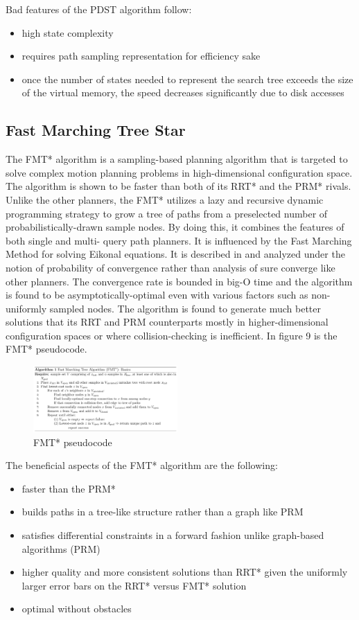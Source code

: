 \documentclass[conference]{IEEEtran} \usepackage[T1]{fontenc} \usepackage[backend=biber, style=ieee]{biblatex}
\begin{document}
Bad features of the PDST algorithm follow:
\begin{itemize}
 \item high state complexity
 \item requires path sampling representation for efficiency sake
 \item once the number of states needed to represent the search tree exceeds the size of the virtual memory, the speed decreases significantly due to disk accesses
\end{itemize}

\subsection{Fast Marching Tree Star} \label{FMT*}
The FMT* algorithm is a sampling-based planning algorithm that is targeted to solve complex motion planning problems in high-dimensional configuration space. The
algorithm is shown to be faster than both of its RRT* and the PRM* rivals. Unlike the other planners, the FMT* utilizes a lazy and recursive dynamic programming 
strategy to grow a tree of paths from a preselected number of probabilistically-drawn sample nodes. By doing this, it combines the features of both single and multi-
query path planners. It is influenced by the Fast Marching Method for solving Eikonal equations. It is described in \cite{fmt_star} and analyzed under the
notion of probability of convergence rather than analysis of sure converge like other planners. The convergence rate is bounded in big-O time and the algorithm
is found to be asymptotically-optimal even with various factors such as non-uniformly sampled nodes. The algorithm is found to generate much better solutions
that its RRT and PRM counterparts mostly in higher-dimensional configuration spaces or where collision-checking is inefficient. In figure 9 is the FMT* pseudocode.

\begin{figure}
\label{figure9} 
\centering 
\includegraphics[width=0.49\textwidth]{fmt_star}
\caption{FMT* pseudocode}
\end{figure}

The beneficial aspects of the FMT* algorithm are the following:
\begin{itemize}
 \item faster than the PRM*
 \item builds paths in a tree-like structure rather than a graph like PRM
 \item satisfies differential constraints in a forward fashion unlike graph-based algorithms (PRM)
 \item higher quality and more consistent solutions than RRT* given the uniformly larger error bars on the RRT* versus FMT* solution
 \item optimal without obstacles
\end{itemize}
\end{document}
